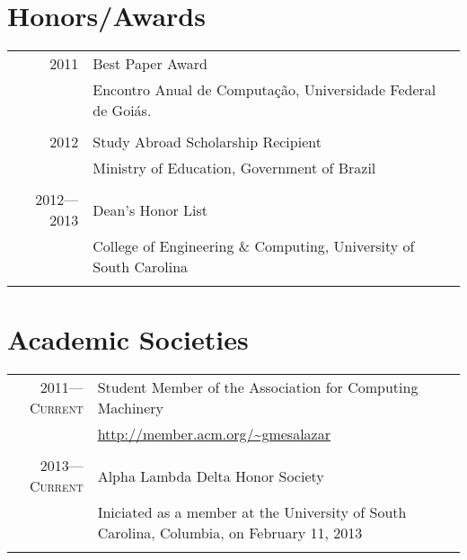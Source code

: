 \documentclass[a4paper,10pt]{article}
\begin{document}
\section{Honors/Awards}
\begin{tabular}{r|p{11cm}}
  \textsc{2011}
  & Best Paper Award\\
  & Encontro Anual de Computação, Universidade Federal de Goiás.\\
  \multicolumn{2}{c}{}\\

  \textsc{2012}
  & Study Abroad Scholarship Recipient\\
  & Ministry of Education, Government of Brazil\\
  \multicolumn{2}{c}{}\\

  \textsc{2012---2013}
  & Dean's Honor List\\
  & College of Engineering \& Computing, University of South Carolina\\
  \multicolumn{2}{c}{}\\
\end{tabular}

\pagebreak

\section{Academic Societies}

\begin{tabular}{r|p{11cm}}
  \textsc{2011---Current}
  & Student Member of the Association for Computing Machinery\\
  & \footnotesize{\url{http://member.acm.org/~gmesalazar}}
  \\\multicolumn{2}{c}{}\\

  \textsc{2013---Current}
  & Alpha Lambda Delta Honor Society\\
  & \footnotesize{Iniciated as a member at the University of South Carolina, Columbia, on February 11, 2013}\\
  \multicolumn{2}{c}{}\\
  
\end{tabular}
\end{document}
